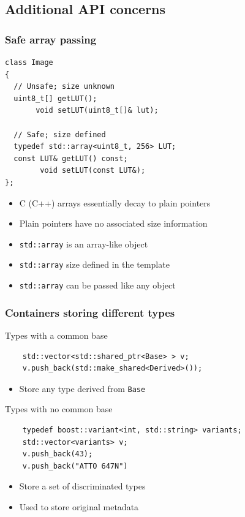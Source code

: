 \documentclass{beamer}
\begin{document}
\subsection{Additional API concerns}

\begin{frame}[fragile]
  \frametitle{Safe array passing}
  \begin{lstlisting}
class Image
{
  // Unsafe; size unknown
  uint8_t[] getLUT();
       void setLUT(uint8_t[]& lut);

  // Safe; size defined
  typedef std::array<uint8_t, 256> LUT;
  const LUT& getLUT() const;
        void setLUT(const LUT&);
};
\end{lstlisting}
  \begin{itemize}
  \item C (C++) arrays essentially decay to plain pointers
  \item Plain pointers have no associated size information
  \item \texttt{std::array} is an array-like object
  \item \texttt{std::array} size defined in the template
  \item \texttt{std::array} can be passed like any object
  \end{itemize}
\end{frame}

\begin{frame}[fragile]
  \frametitle{Containers storing different types}
\begin{block}{Types with a common base}
  \begin{lstlisting}
    std::vector<std::shared_ptr<Base> > v;
    v.push_back(std::make_shared<Derived>());
\end{lstlisting}
  \begin{itemize}
  \item Store any type derived from \texttt{Base}
  \end{itemize}
\end{block}
\begin{block}{Types with no common base}
  \begin{lstlisting}
    typedef boost::variant<int, std::string> variants;
    std::vector<variants> v;
    v.push_back(43);
    v.push_back("ATTO 647N")
\end{lstlisting}
  \begin{itemize}
  \item Store a set of discriminated types
  \item Used to store original metadata
  \end{itemize}
\end{block}
\end{frame}
\end{document}
